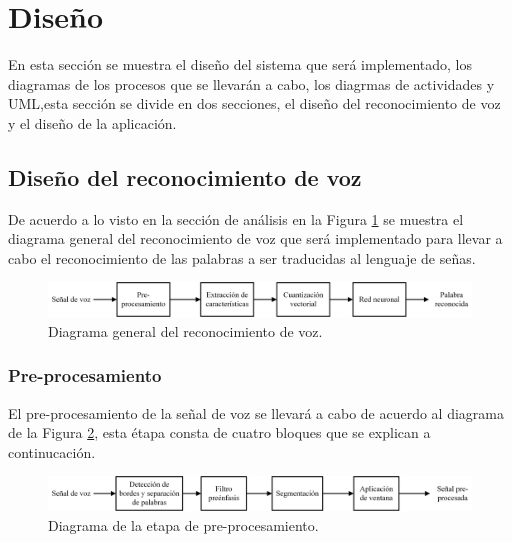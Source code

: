 
\section{Diseño}

En esta sección se muestra el diseño del sistema que será implementado, los diagramas de los procesos que se llevarán a cabo, los diagrmas de actividades y UML,esta sección se divide en dos secciones, el diseño del reconocimiento de voz y el diseño de la aplicación.

\subsection{Diseño del reconocimiento de voz}

De acuerdo a lo visto en la sección de análisis en la Figura \ref{fig:SRgeneral} se muestra el diagrama general del reconocimiento de voz que será implementado para llevar a cabo el reconocimiento de las palabras a ser traducidas al lenguaje de señas.

		\begin{figure}[H]
			\centering
			\includegraphics[width=1\linewidth]{figures/srGeneral}
			\caption{Diagrama general del reconocimiento de voz.}
			\label{fig:SRgeneral}
		\end{figure}
		
\subsubsection*{Pre-procesamiento}		

El pre-procesamiento de la señal de voz se llevará a cabo de acuerdo al diagrama de la  Figura \ref{fig:preprocesamientoDes}, esta étapa consta de cuatro bloques que se explican a continucación.

		\begin{figure}[H]
			\centering
			\includegraphics[width=1\linewidth]{figures/preprocesamientoDes}
			\caption{Diagrama de la etapa de pre-procesamiento.}
			\label{fig:preprocesamientoDes}
		\end{figure}
		
